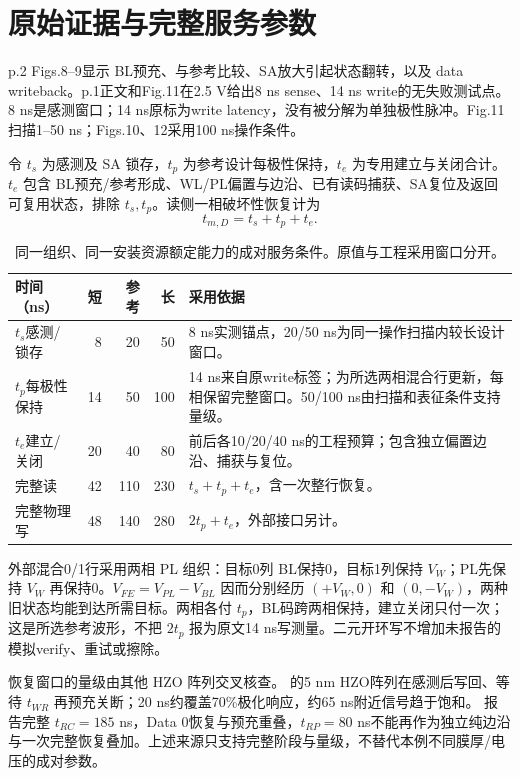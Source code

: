\section{原始证据与完整服务参数}

 p.2 Figs.8--9显示 BL预充、与参考比较、SA放大引起状态翻转，以及 data writeback。p.1正文和Fig.11在2.5 V给出8 ns sense、14 ns write的无失败测试点。8 ns是感测窗口；14 ns原标为write latency，没有被分解为单独极性脉冲。Fig.11扫描1--50 ns；Figs.10、12采用100 ns操作条件。\cite{feram03}

令 $t_s$ 为感测及 SA 锁存，$t_p$ 为参考设计每极性保持，$t_e$ 为专用建立与关闭合计。$t_e$ 包含 BL预充/参考形成、WL/PL偏置与边沿、已有读码捕获、SA复位及返回可复用状态，排除 $t_s,t_p$。读侧一相破坏性恢复计为
\begin{equation}
t_{m,D}=t_s+t_p+t_e.
\label{08_feram_hfo2:eq:mediaread}
\end{equation}

\begin{table}[htbp]\centering\small
\begin{tabularx}{\textwidth}{@{}p{32mm}rrrX@{}}\toprule
时间（ns） & 短 & 参考 & 长 & 采用依据\\\midrule
$t_s$感测/锁存 & 8 & 20 & 50 & 8 ns实测锚点，20/50 ns为同一操作扫描内较长设计窗口。\\
$t_p$每极性保持 & 14 & 50 & 100 & 14 ns来自原write标签；为所选两相混合行更新，每相保留完整窗口。50/100 ns由扫描和表征条件支持量级。\\
$t_e$建立/关闭 & 20 & 40 & 80 & 前后各10/20/40 ns的工程预算；包含独立偏置边沿、捕获与复位。\\
完整读 & 42 & 110 & 230 & $t_s+t_p+t_e$，含一次整行恢复。\\
完整物理写 & 48 & 140 & 280 & $2t_p+t_e$，外部接口另计。\\\bottomrule
\end{tabularx}
\caption{同一组织、同一安装资源额定能力的成对服务条件。原值与工程采用窗口分开。}
\end{table}

外部混合0/1行采用两相 PL 组织：目标0列 BL保持0，目标1列保持 $V_W$；PL先保持 $V_W$ 再保持0。$V_{FE}=V_{PL}-V_{BL}$ 因而分别经历 $(+V_W,0)$ 和 $(0,-V_W)$，两种旧状态均能到达所需目标。两相各付 $t_p$，BL码跨两相保持，建立关闭只付一次；这是所选参考波形，不把 $2t_p$ 报为原文14 ns写测量。二元开环写不增加未报告的模拟verify、重试或擦除。

恢复窗口的量级由其他 HZO 阵列交叉核查。 的5 nm HZO阵列在感测后写回、等待 $t_{WR}$ 再预充关断；20 ns约覆盖70\%极化响应，约65 ns附近信号趋于饱和。 报告完整 $t_{RC}=185$ ns，Data 0恢复与预充重叠，$t_{RP}=80$ ns不能再作为独立纯边沿与一次完整恢复叠加。上述来源只支持完整阶段与量级，不替代本例不同膜厚/电压的成对参数。\cite{feram02,feram04}

